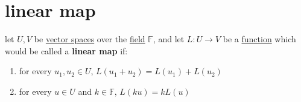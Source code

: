\documentclass[a4paper,12pt]{article}
\begin{document}
\section{linear map}
\label{sec:orgdf3d063}
\begin{definition}
let \(U,V\) be \hyperref[sec:orgea93933]{vector spaces} over the \hyperref[sec:orgd95c18e]{field} \(\mathbb{F}\), and let \(L: U \to V\) be a \href{discrete_maths2.org}{function} which would be called a \textbf{linear map} if:\\
\begin{enumerate}
\item for every \(u_1,u_2 \in U\), \(L(u_1+u_2) = L(u_1) + L(u_2)\)\\
\item for every \(u \in U\) and \(k \in \mathbb{F}\), \(L(ku) = kL(u)\)\\
\end{enumerate}


\end{definition}
\end{document}
